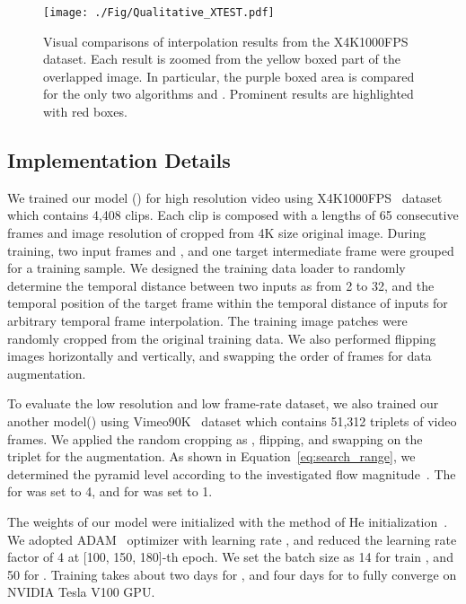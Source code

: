\documentclass[10pt,twocolumn,letterpaper]{article}
\begin{document}
\begin{figure*}
\centering
\texttt{[image: ./Fig/Qualitative\_XTEST.pdf]}
\caption{Visual comparisons of interpolation results from the X4K1000FPS dataset. Each result is zoomed from the yellow boxed part of the overlapped image. In particular, the purple boxed area is compared for the only two algorithms  and . Prominent results are highlighted with red boxes.}
\label{fig:Qualitative_Xtest}
\end{figure*}

\subsection{Implementation Details}
We trained our model () for high resolution video using X4K1000FPS~\cite{sim2021xvfi} dataset which contains 4,408 clips. Each clip is composed with a lengths of 65 consecutive frames and image resolution of  cropped from 4K size original image.
During training, two input frames  and , and one target intermediate frame  were grouped for a training sample. 
We designed the training data loader to randomly determine the temporal distance between two inputs as from 2 to 32, and the temporal position of the target frame within the temporal distance of inputs for arbitrary temporal frame interpolation.
The  training image patches were randomly cropped from the original training data. 
We also performed flipping images horizontally and vertically, and swapping the order of frames for data augmentation.


To evaluate the low resolution and low frame-rate dataset, we also trained our another model() using Vimeo90K~\cite{xue2019video} dataset which contains 51,312 triplets of  video frames.
We applied the random cropping as , flipping, and swapping on the triplet for the augmentation.
As shown in Equation~\ref{eq:search_range}, we determined the pyramid level  according to the investigated flow magnitude~\cite{sim2021xvfi}. The  for  was set to 4, and for  was set to 1.

The weights of our model were initialized with the method of He initialization~\cite{he2015delving}. 
We adopted ADAM~\cite{kingma2014adam} optimizer with learning rate , and reduced the learning rate factor of 4 at [100, 150, 180]-th epoch.
We set the batch size as 14 for train , and 50 for .
Training takes about two days for , and four days for  to fully converge on NVIDIA Tesla V100 GPU.
\end{document}
